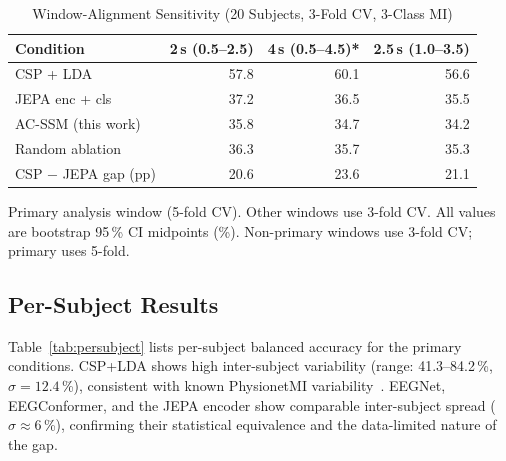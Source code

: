 \documentclass[journal]{IEEEtran}
\begin{document}
\begin{table}[t]
\centering
\caption{Window-Alignment Sensitivity (20 Subjects, 3-Fold CV, 3-Class MI)}
\label{tab:window_sensitivity}
\setlength{\tabcolsep}{4pt}
\begin{tabular}{lrrr}
\toprule
\textbf{Condition} & \textbf{2\,s (0.5–2.5)} & \textbf{4\,s (0.5–4.5)*} & \textbf{2.5\,s (1.0–3.5)} \\
\midrule
CSP + LDA  & 57.8 & 60.1 & 56.6 \\
JEPA enc + cls  & 37.2 & 36.5 & 35.5 \\
AC-SSM (this work)  & 35.8 & 34.7 & 34.2 \\
Random ablation  & 36.3 & 35.7 & 35.3 \\
\midrule
CSP $-$ JEPA gap (pp) & 20.6 & 23.6 & 21.1 \\
\bottomrule
\end{tabular}
\vspace{0.2em}
{\footnotesize * Primary analysis window (5-fold CV). Other windows use 3-fold CV.
All values are bootstrap 95\,\% CI midpoints (\%). Non-primary windows use 3-fold CV; primary uses 5-fold.}
\end{table}

\subsection{Per-Subject Results}

Table~\ref{tab:persubject} lists per-subject balanced accuracy for the primary conditions.
CSP+LDA shows high inter-subject variability (range: 41.3--84.2\,\%, $\sigma = 12.4$\,\%), consistent with known PhysionetMI variability~\cite{stieger2021dataset}.
EEGNet, EEGConformer, and the JEPA encoder show comparable inter-subject spread ($\sigma \approx 6$\,\%), confirming their statistical equivalence and the data-limited nature of the gap.
\end{document}
